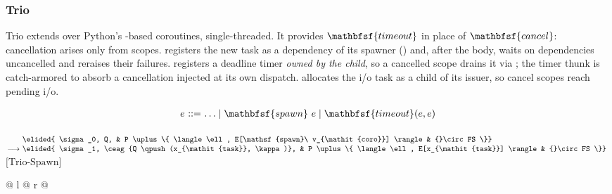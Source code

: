 \subsubsection{Trio}

Trio extends \lasync over Python's \exn-based coroutines, single-threaded. It provides $\mathbfsf{timeout}$ in place of $\mathbfsf{cancel}$: cancellation arises only from scopes.  registers the new task as a dependency of its spawner (\dyn \extent) and, after the body, waits on dependencies uncancelled and reraises their failures.  registers a deadline timer \emph{owned by the child}, so a cancelled scope drains it via ; the timer thunk is catch-armored to absorb a cancellation injected at its own dispatch.  allocates the i/o task as a child of its issuer, so cancel scopes reach pending i/o.

$$
\begin{array}{r@{\ }c@{\ }l}
e & ::= & \ldots \mid \mathbfsf{spawn}\ e \mid \mathbfsf{timeout}(e, e)
\end{array}
$$

\noindent
$\begin{array}[t]{@{}r@{\ }l@{\ }l@{}l@{}}
                & \elided{ \sigma_0, Q, & P \uplus \{ \langle \ell, E[\mathsf{spawn}\ v_{\mathit{coro}}] \rangle & {}\circ FS \}} \\
\longrightarrow & \elided{ \sigma_1, \ceag{Q \qpush (x_{\mathit{task}}, \kappa)}, & P \uplus \{ \langle \ell, E[x_{\mathit{task}}] \rangle & {}\circ FS \}}
\end{array}$\hfill$\text{[Trio-Spawn]}$\par
\noindent
\begin{tabular*}{\linewidth}{@{} l @{\extracolsep{\fill}} r @{}}
\end{tabular*}

